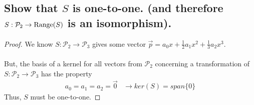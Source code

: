 \documentclass[../main.tex]{subfiles}
\begin{document}
\subsection{Show that $S$ is one-to-one. (and therefore $S: \mathcal{P}_2 \to {\rm Range}(S)$ is an isomorphism).}
\begin{proof}
        We know ${\displaystyle S:\mathcal{P}_{2}\rightarrow \mathcal{P}_{3}}$ gives some vector ${\displaystyle \vec{p} =a_{0} x+\frac{1}{2} a_{1} x^{2} +\frac{1}{3} a_{2} x^{3}}$. \\\\
        But, the basis of a kernel for all vectors from $\displaystyle \mathcal{P}_{2}$ concerning a transformation of ${\displaystyle S:\mathcal{P}_{2}\rightarrow \mathcal{P}_{3}}$ has the property
        \begin{equation*}
                \begin{aligned}
                        {\displaystyle a_{0} =a_{1} =a_{2} =\vec{0}} & \rightarrow ker( S) =span\{0\}
                \end{aligned}
        \end{equation*}
        Thus, ${\displaystyle S}$ must be one-to-one.
\end{proof}
\end{document}
